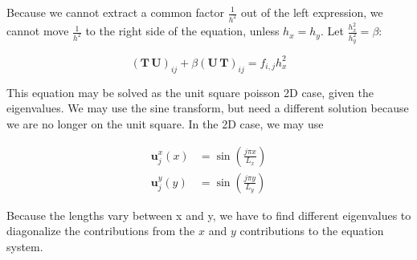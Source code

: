 Because we cannot extract a common factor $\frac{1}{h^2}$ out of the left expression, we cannot move $\frac{1}{h^2}$ to the right side of the equation, unless $h_x = h_y$. Let $\frac{h_x^2}{h_y^2} = \beta$:

\begin{equation}
(\mathbf{{T}} \, \mathbf{{U}})_{ij} +\beta (\mathbf{{U}} \, \mathbf{{T}})_{ij} = f_{i,j} h_x^2
\end{equation}

This equation may be solved as the unit square poisson 2D case, given the eigenvalues. We may use the sine transform, but need a different solution because we are no longer on the unit square. In the 2D case, we may use 

\begin{align}
  \mathbf{u}_j^x(x) &= \sin(\frac{j \pi x}{L_x}) \\
  \mathbf{u}_j^y(y) &= \sin(\frac{j \pi y}{L_y})
\end{align}

Because the lengths vary between x and y, we have to find different eigenvalues to diagonalize the contributions from the $x$ and $y$ contributions to the equation system.
